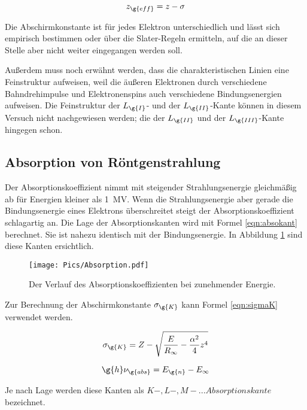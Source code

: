 \begin{equation}
  z_{\g{eff}} = z - \sigma
  \label{eqn:zeff}
\end{equation}

Die Abschirmkonstante ist für jedes Elektron unterschiedlich und lässt sich empirisch
bestimmen oder über die Slater-Regeln ermitteln, auf die an dieser Stelle aber nicht
weiter eingegangen werden soll.

Außerdem muss noch erwähnt werden, dass die charakteristischen Linien eine Feinstruktur
aufweisen, weil die äußeren Elektronen durch verschiedene Bahndrehimpulse und Elektronenspins
auch verschiedene Bindungsenergien aufweisen. Die Feinstruktur der $L_{\g{I}}$- und der
$L_{\g{II}}$-Kante können in diesem Versuch nicht nachgewiesen werden; die der $L_{\g{II}}$
und der $L_{\g{III}}$-Kante hingegen schon.

\subsection{Absorption von Röntgenstrahlung}

Der Absorptionskoeffizient nimmt mit steigender Strahlungsenergie gleichmäßig ab für Energien
kleiner als \SI{1}{\mega\volt}. Wenn die
Strahlungsenergie aber gerade die Bindungsenergie eines Elektrons überschreitet steigt der
Absorptionskoeffizient schlagartig an.
Die Lage der Absorptionskanten wird mit Formel \eqref{eqn:absokant} berechnet. Sie ist nahezu
identisch mit der Bindungsenergie. In Abbildung \ref{fig:absokant} sind diese Kanten
ersichtlich.

\begin{figure}
  \centering
  \texttt{[image: Pics/Absorption.pdf]}
  \caption{Der Verlauf des Absorptionskoeffizienten bei zunehmender Energie. \cite{anleitung}}
  \label{fig:absokant}
\end{figure}

Zur Berechnung der Abschirmkonstante $\sigma_{\g{K}}$ kann Formel \eqref{eqn:sigmaK}
verwendet werden.

\begin{align}
  \sigma_{\g{K}} = Z - \sqrt{\frac{E}{R_\infty}- \frac{\alpha^2}{4}z^4}
  \label{eqn:sigmaK}
\end{align}

\begin{equation}
  \g{h} \nu_{\g{abs}} = E_{\g{n}} - E_{\infty}
  \label{eqn:absokant}
\end{equation}

Je nach Lage werden diese Kanten als $K-,L-,M-...Absorptionskante$ bezeichnet.

